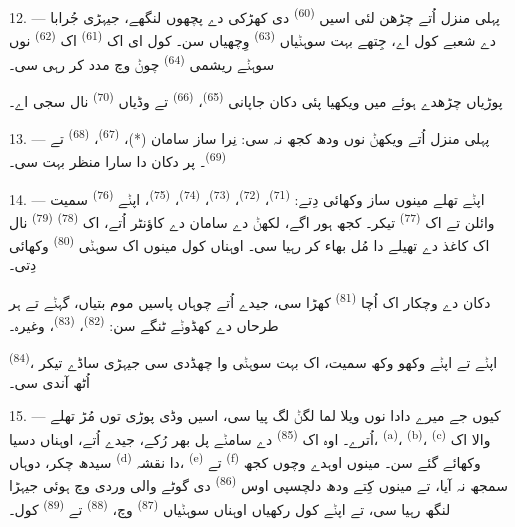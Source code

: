 12. --- پہلی منزل اُتے چڑھن لئی اسیں  \textsuperscript{(60)} دی
کھڑکی دے پچھوں لنگھے، جیہڑی جُرابا دے شعبے کول اے، جِتھے بہت سوہݨیاں 
\textsuperscript{(63)} وِچھیاں سن۔ کول ای اک 
\textsuperscript{(61)} اک  \textsuperscript{(62)} نوں سوہݨے ریشمی
 \textsuperscript{(64)} چوݨ وچ مدد کر رہی سی۔

پوڑیاں چڑھدے ہوئے میں ویکھیا پئی دکان جاپانی  \textsuperscript{(65)}،
 \textsuperscript{(66)} تے وڈیاں  \textsuperscript{(70)}
نال سجی اے۔

13. --- پہلی منزل اُتے ویکھݨ نوں ودھ کجھ نہ سی: نِرا ساز سامان (*)،
 \textsuperscript{(67)}، 
\textsuperscript{(68)} تے  \textsuperscript{(69)}۔ پر دکان دا سارا
منظر بہت  سی۔

14. --- اپݨے تھلے مینوں ساز وکھائی دِتے:  \textsuperscript{(71)}،
 \textsuperscript{(72)}،  \textsuperscript{(73)}،
 \textsuperscript{(74)}،  \textsuperscript{(75)}،
اپݨے  \textsuperscript{(76)} سمیت وائلن تے اک 
\textsuperscript{(77)} تیکر۔ کجھ ہور اگے، لکھݨ دے سامان دے کاؤنٹر اُتے، اک
 \textsuperscript{(78)}  \textsuperscript{(79)}
نال اک کاغذ دے تھیلے دا مُل بھاء کر رہیا سی۔ اوہناں کول مینوں اک سوہݨی
 \textsuperscript{(80)} وکھائی دِتی۔

دکان دے وچکار اک اُچا  \textsuperscript{(81)} کھڑا سی، جیدے
اُتے چوہاں پاسیں موم بتیاں، گہݨے تے ہر طرحاں دے کھڈوݨے ٹنگے سن:
 \textsuperscript{(82)}،  \textsuperscript{(83)}،
وغیرہ۔

 \textsuperscript{(84)}، اپݨے  تے اپݨے وکھو
وکھ  سمیت، اک بہت سوہݨی وا چھڈدی سی جیہڑی ساڈے تیکر اُٹھ آندی سی۔

\VUsaut{3.4mm}
\VUsaut{2.8mm}

15. --- کیوں جے میرے دادا نوں ویلا لما لگݨ لگ پیا سی، اسیں وڈی پوڑی توں مُڑ تھلے
اُترے۔ اوہ اک  \textsuperscript{(85)} دے سامݨے پل بھر رُکے،
جیدے اُتے، اوہناں دسیا،  \textsuperscript{(a)}،
 \textsuperscript{(b)}، 
\textsuperscript{(c)}  والا اک سیدھ چکر، دوہاں
 \textsuperscript{(d)} دا نقشہ،  \textsuperscript{(e)}
تے  \textsuperscript{(f)} وکھائے گئے سن۔ مینوں اوہدے وچوں کجھ سمجھ
نہ آیا، تے مینوں کِتے ودھ دلچسپی اوس  \textsuperscript{(86)}
دی گوٹے والی وردی وچ ہوئی جیہڑا لنگھ رہیا سی، تے اپݨے کول رکھیاں اوہناں سوہݨیاں
 \textsuperscript{(87)} وچ،  \textsuperscript{(88)} تے
 \textsuperscript{(89)} کول۔

